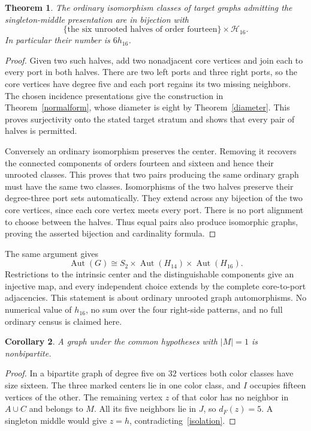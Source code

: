 \documentclass[11pt]{article}
\newtheorem{theorem}{Theorem}
\newtheorem{corollary}[theorem]{Corollary}
\begin{document}
\begin{theorem}\label{product}
The ordinary isomorphism classes of target graphs admitting the
singleton-middle presentation are in bijection with
\[
 \{\text{the six unrooted halves of order fourteen}\}
 \times\mathcal H_{16}.
\]
In particular their number is $6h_{16}$.
\end{theorem}
\begin{proof}
Given two such halves, add two nonadjacent core vertices and join each
to every port in both halves. There are two left ports and three right
ports, so the core vertices have degree five and each port regains
its two missing neighbors. The chosen incidence presentations give the
construction in Theorem~\ref{normalform}, whose diameter is eight by
Theorem~\ref{diameter}. This proves surjectivity onto the stated target
stratum and shows that every pair of halves is permitted.

Conversely an ordinary isomorphism preserves the center. Removing it
recovers the connected components of orders fourteen and sixteen and
hence their unrooted classes. This proves that two pairs producing the
same ordinary graph must have the same two classes. Isomorphisms of
the two halves preserve their degree-three port sets automatically.
They extend across any bijection of the two core vertices, since each
core vertex meets every port. There is no port alignment to choose
between the halves. Thus equal pairs also produce isomorphic graphs,
proving the asserted bijection and cardinality formula.
\end{proof}

The same argument gives
\[
 \operatorname{Aut}(G)\cong
 S_2\times\operatorname{Aut}(H_{14})\times\operatorname{Aut}(H_{16}).
\]
Restrictions to the intrinsic center and the distinguishable components
give an injective map, and every independent choice extends by the
complete core-to-port adjacencies. This statement is about ordinary
unrooted graph automorphisms. No numerical value of $h_{16}$, no sum
over the four right-side patterns, and no full ordinary census is
claimed here.

\begin{corollary}\label{nonbipartite}
A graph under the common hypotheses with $|M|=1$ is nonbipartite.
\end{corollary}
\begin{proof}
In a bipartite graph of degree five on $32$ vertices both color classes
have size sixteen. The three marked centers lie in one color class,
and $I$ occupies fifteen vertices of the other. The remaining vertex
$z$ of that color has no neighbor in $A\cup C$ and belongs to $M$.
All its five neighbors lie in $J$, so $d_F(z)=5$. A singleton middle
would give $z=h$, contradicting~\eqref{isolation}.
\end{proof}
\end{document}
